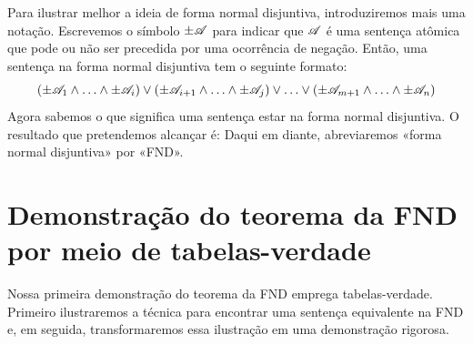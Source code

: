 Para ilustrar melhor a ideia de forma normal disjuntiva, introduziremos mais uma notação. Escrevemos o símbolo $\pm\mathscr{A}$ para indicar que $\mathscr{A}$ é uma sentença atômica que pode ou não ser precedida por uma ocorrência de negação. Então, uma sentença na forma normal disjuntiva tem o seguinte formato:
	$$(\pm \mathscr{A}_1 \land \ldots \land \pm \mathscr{A}_i) \lor (\pm \mathscr{A}_{i+1} \land \ldots \land \pm\mathscr{A}_j) \lor \ldots \lor (\pm\mathscr{A}_{m+1} \land \ldots \land \pm \mathscr{A}_n)$$
Agora sabemos o que significa uma sentença estar na forma normal disjuntiva. O resultado que pretendemos alcançar é:
Daqui em diante, abreviaremos «forma normal disjuntiva» por «FND».


\section{Demonstração do teorema da FND por meio de tabelas-verdade}
\label{s:DNFTruthTable}

Nossa primeira demonstração do teorema da FND emprega tabelas-verdade. Primeiro ilustraremos a técnica para encontrar uma sentença equivalente na FND e, em seguida, transformaremos essa ilustração em uma demonstração rigorosa.


